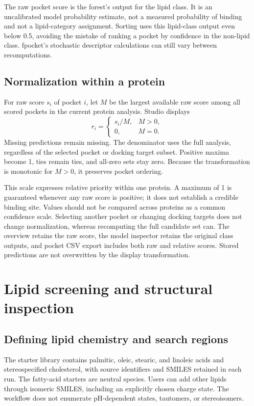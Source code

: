 \documentclass[10pt,a4paper]{article}
\begin{document}
The raw pocket score is the forest's output for the lipid class. It is an uncalibrated model probability estimate, not a measured probability of binding and not a lipid-category assignment. Sorting uses this lipid-class output even below 0.5, avoiding the mistake of ranking a pocket by confidence in the non-lipid class. fpocket's stochastic descriptor calculations can still vary between recomputations.

\subsection{Normalization within a protein}
For raw score $s_i$ of pocket $i$, let $M$ be the largest available raw score among all scored pockets in the current protein analysis. Studio displays
\begin{equation}
r_i=\begin{cases}s_i/M,&M>0,\\0,&M=0.\end{cases}
\end{equation}
Missing predictions remain missing. The denominator uses the full analysis, regardless of the selected pocket or docking target subset. Positive maxima become 1, ties remain ties, and all-zero sets stay zero. Because the transformation is monotonic for $M>0$, it preserves pocket ordering.

This scale expresses relative priority within one protein. A maximum of 1 is guaranteed whenever any raw score is positive; it does not establish a credible binding site. Values should not be compared across proteins as a common confidence scale. Selecting another pocket or changing docking targets does not change normalization, whereas recomputing the full candidate set can. The overview retains the raw score, the model inspector retains the original class outputs, and pocket CSV export includes both raw and relative scores. Stored predictions are not overwritten by the display transformation.

\section{Lipid screening and structural inspection}
\subsection{Defining lipid chemistry and search regions}
The starter library contains palmitic, oleic, stearic, and linoleic acids and stereospecified cholesterol, with source identifiers and SMILES retained in each run. The fatty-acid starters are neutral species. Users can add other lipids through isomeric SMILES, including an explicitly chosen charge state. The workflow does not enumerate pH-dependent states, tautomers, or stereoisomers.
\end{document}
